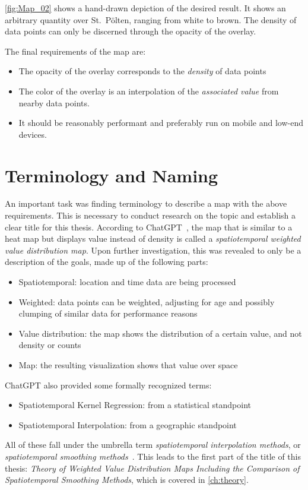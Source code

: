 \autoref{fig:Map_02} shows a hand-drawn depiction of the desired result. It
shows an arbitrary quantity over St.\ Pölten, ranging from white to brown. The density of data points can only be discerned through the opacity of the overlay.

The final requirements of the map are:
\begin{itemize}
    \item The opacity of the overlay corresponds to the \emph{density} of data points
    \item The color of the overlay is an interpolation of the \emph{associated value}
          from nearby data points.
    \item It should be reasonably performant and preferably run on mobile and low-end devices.
\end{itemize}

\section{Terminology and Naming}

An important task was finding terminology to describe a map with the above
requirements. This is necessary to conduct research on the topic and establish
a clear title for this thesis. According to ChatGPT~\cite{chatgpt:01}, the map
that is similar to a heat map but displays value instead of density is called a
\emph{spatiotemporal weighted value distribution map}. Upon further
investigation, this was revealed to only be a description of the goals, made up
of the following parts:
\begin{itemize}
    \item Spatiotemporal: location and time data are being processed
    \item Weighted: data points can be weighted, adjusting for age and possibly clumping
          of similar data for performance reasons
    \item Value distribution: the map shows the distribution of a certain value, and not
          density or counts
    \item Map: the resulting visualization shows that value over space
\end{itemize}

ChatGPT also provided some formally recognized terms:
\begin{itemize}
    \item Spatiotemporal Kernel Regression: from a statistical standpoint
    \item Spatiotemporal Interpolation: from a geographic standpoint
\end{itemize}
All of these fall under the umbrella term \emph{spatiotemporal interpolation methods}, or \emph{spatiotemporal smoothing methods}~\cite{mdpi:02}. This leads to the first part of the title of this thesis: \emph{Theory of Weighted Value Distribution Maps Including the Comparison of Spatiotemporal Smoothing Methods}, which is covered in \autoref{ch:theory}.


